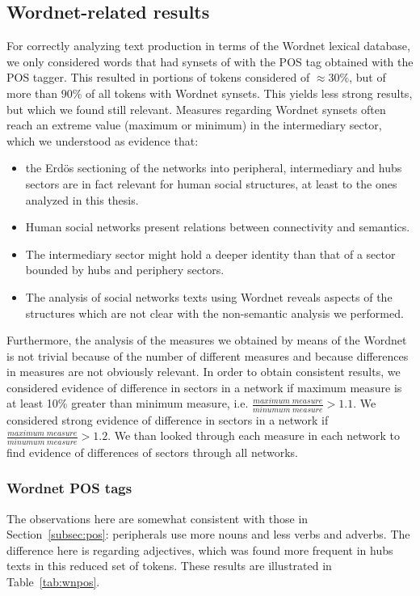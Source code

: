 \subsection{Wordnet-related results}
For correctly analyzing text production in terms of the Wordnet lexical database,
we only considered words that had synsets of with the POS tag obtained with the POS tagger.
This resulted in portions of tokens considered of $\approx 30\%$,
but of more than $90\%$ of all tokens with Wordnet synsets.
This yields less strong results, but which we found still relevant.
Measures regarding Wordnet synsets often reach an extreme value (maximum or minimum)
in the intermediary sector, which we understood as evidence that:
\begin{itemize}
	\item the Erd\"os sectioning of the networks into peripheral, intermediary and hubs sectors are in fact relevant for human social structures, at least to the ones analyzed in this thesis.
	\item Human social networks present relations between connectivity and semantics.
	\item The intermediary sector might hold a deeper identity than that of a sector bounded by hubs and periphery sectors.
	\item The analysis of social networks texts using Wordnet reveals aspects of the structures which are not clear with the non-semantic analysis we performed.
\end{itemize}

Furthermore, the analysis of the measures we obtained by means of the Wordnet
is not trivial because of the number of different measures
and because differences in measures are not obviously relevant.
In order to obtain consistent results, we considered evidence of difference in sectors in a network
if maximum measure is at least 10\% greater than minimum measure,
i.e. $\frac{maximum\;measure}{minumum\;measure}>1.1$.
We considered strong evidence of difference in sectors in a network if
$\frac{maximum\;measure}{minumum\;measure}>1.2$.
We than looked through each measure in each network to find evidence of
differences of sectors through all networks.

\subsubsection{Wordnet POS tags}\label{subsec:wnpos}
The observations here are somewhat consistent with those in Section~\ref{subsec:pos}:
peripherals use more nouns and less verbs and adverbs.
The difference here is regarding adjectives, which was found more frequent in hubs texts
in this reduced set of tokens.
These results are illustrated in Table~\ref{tab:wnpos}.



